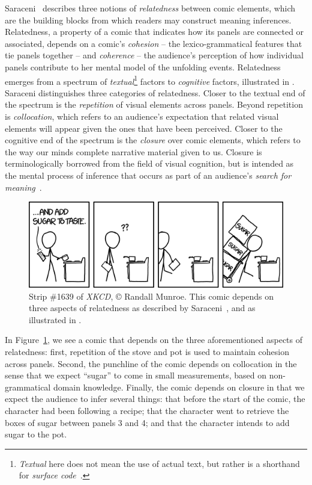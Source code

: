%
Saraceni~\cite{saraceni2016relatedness} describes three notions of
\emph{relatedness} between comic elements, which are the building blocks
from which readers may construct meaning inferences.
Relatedness, a property of a comic that indicates how its panels are
connected or associated, depends on a comic's \emph{cohesion} -- the
lexico-grammatical features that tie panels together -- and \emph{coherence} --
the audience's perception of how individual panels contribute to her mental model
of the unfolding events. Relatedness emerges from a spectrum of \emph{textual}\footnote{\emph{Textual} here does not mean the use of actual text, but rather is a shorthand for \emph{surface code}~\cite{zwaan1998situation}.}
factors to \emph{cognitive} factors, illustrated in .
%
Saraceni distinguishes three categories of relatedness.
Closer to the textual end of the spectrum is the \emph{repetition} of visual
elements across panels. Beyond repetition is \emph{collocation}, which refers
to an audience's expectation that related visual elements will appear given the
ones that have been perceived. Closer to the cognitive end of the spectrum is
the \emph{closure} over comic elements, which refers to the way our minds 
complete narrative material given to us. Closure is terminologically borrowed 
from the field of visual cognition, but is intended as the mental process 
of inference that occurs as part of an audience's 
\emph{search for meaning}~\cite{gerrig1994readers}.

%
\begin{figure}[t]
	\includegraphics[width=\columnwidth]{xkcd-to_taste.png}
	\caption{
		Strip \#1639 of {\em XKCD}, {\small\copyright} Randall Munroe. This comic
		depends on three aspects of relatedness as described by 
                Saraceni~\cite{saraceni2016relatedness}, and as illustrated in 
		.
	}
\label{fig:xkcd}
\end{figure}
In Figure~\ref{fig:xkcd}, we see a comic that depends on the three aforementioned 
aspects of relatedness: first, repetition of the stove and pot is used to maintain
cohesion across panels. Second, the punchline of the comic depends on
collocation in the sense that we expect ``sugar'' to come in small
measurements, based on non-grammatical domain knowledge.  Finally, the
comic depends on closure in that we expect the audience to infer several
things: that before the start of the comic, the character had been
following a recipe; that the character went to retrieve the boxes of sugar
between panels 3 and 4; and that the character intends to add sugar to the
pot.

